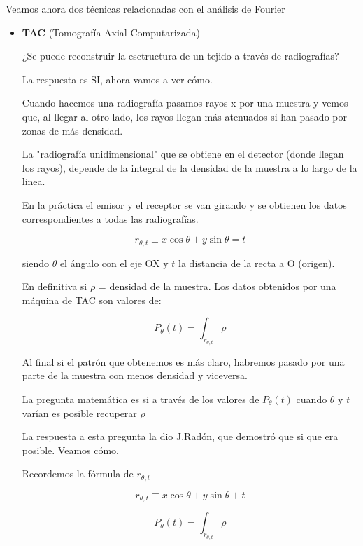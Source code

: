Veamos ahora dos técnicas relacionadas con el análisis de Fourier
\begin{itemize}
\item \textbf{TAC} (Tomografía Axial Computarizada)

¿Se puede reconstruir la esctructura de un tejido a través de radiografías?

	La respuesta es SI, ahora vamos a ver cómo.


	Cuando hacemos una radiografía pasamos rayos x por una muestra y vemos que, al llegar al otro lado, los rayos llegan más atenuados si han pasado por zonas de más densidad.

	La "radiografía unidimensional" que se obtiene en el detector (donde llegan los rayos), depende de la integral de la densidad de la muestra a lo largo de la linea.

	En la práctica el emisor y el receptor se van girando y se obtienen los datos correspondientes a todas las radiografías.

	$$r_{\theta , t} \equiv x \cos\theta + y\sin\theta = t$$

	\begin{center}
		\centering
	\end{center}

	siendo $\theta$ el ángulo con el eje OX y $t$ la distancia de la recta a O (origen).

	 \begin{center}
		\centering
	\end{center}


En definitiva si $\rho$ = densidad de la muestra. Los datos obtenidos por una máquina de TAC son valores de:

$$P_{\theta} (t) = \int_{r_{\theta , t}} \rho$$

Al final si el patrón que obtenemos es más claro, habremos pasado por una parte de la muestra con menos densidad y viceversa.

La pregunta matemática es si a través de los valores de $P_{\theta}(t)$ cuando $\theta$ y $t$ varían es posible recuperar $\rho$

La respuesta a esta pregunta la dio J.Radón, que demostró que si que era posible. Veamos cómo.

Recordemos la fórmula de $r_{\theta,t}$

	$$r_{\theta , t} \equiv x \cos\theta + y\sin\theta + t$$

	$$P_{\theta} (t) = \int_{r_{\theta , t}} \rho $$


\end{itemize}
